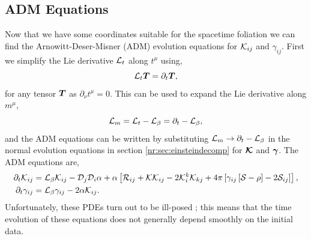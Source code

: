 \subsection{ADM Equations} \label{nr:sec:ADM}
Now that we have some coordinates suitable for the spacetime foliation we can find the Arnowitt-Deser-Misner (ADM) evolution equations for $\mathcal{K}_{ij}$ and $\gamma_{ij}$. First we simplify the Lie derivative $\mathcal{L}_t$ along $t^\mu$ using,
\begin{equation}
\mathcal{L}_t \boldsymbol{T} = \partial_t \boldsymbol{T},
\end{equation}
for any tensor $\boldsymbol{T}$ as $\partial_\nu t^\mu=0$. This can be used to expand the Lie derivative along $m^\mu$,
\begin{equation} \mathcal{L}_m = \mathcal{L}_{t} - \mathcal{L}_\beta  = \partial_t - \mathcal{L}_\beta,\end{equation}
and the ADM equations can be written by substituting $\mathcal{L}_m\rightarrow \partial_t - \mathcal{L}_\beta$ in the normal evolution equations in section \ref{nr:sec:einsteindecomp} for $\boldsymbol{\mathcal{K}}$ and $\boldsymbol{\gamma}$. The ADM equations are,
\begin{align} 
\partial_t \mathcal{K}_{ij} &= \mathcal{L}_\beta \mathcal{K}_{ij}  -\mathcal{D}_j\mathcal{D}_i \alpha + \alpha \left[ \mathcal{R}_{ij} + \mathcal{K}\mathcal{K}_{ij} - 2\mathcal{K}^k_i\mathcal{K}_{kj} + 4\pi \left[ \gamma_{ij}\left[ \mathcal{S}-\rho\right]-2\mathcal{S}_{ij}\right]\right],\\
\partial_t \gamma_{ij} &= \mathcal{L}_\beta \gamma_{ij} - 2\alpha\mathcal{K}_{ij}.\end{align}
Unfortunately, these PDEs turn out to be ill-posed \cite{frittelli2000ill}; this means that the time evolution of these equations does not generally depend smoothly on the initial data.


